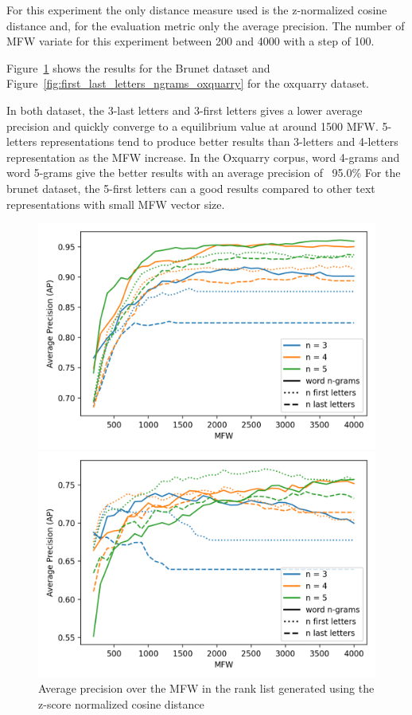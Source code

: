 For this experiment the only distance measure used is the z-normalized cosine distance and, for the evaluation metric only the average precision.
The number of MFW variate for this experiment between 200 and 4000 with a step of 100.

Figure~\ref{fig:first_last_letters_ngrams_brunet} shows the results for the Brunet dataset and Figure~\ref{fig:first_last_letters_ngrams_oxquarry} for the oxquarry dataset.

In both dataset, the 3-last letters and 3-first letters gives a lower average precision and quickly converge to a equilibrium value at around 1500 MFW.
5-letters representations tend to produce better results than 3-letters and 4-letters representation as the MFW increase.
In the Oxquarry corpus, word 4-grams and word 5-grams give the better results with an average precision of ~95.0\%
For the brunet dataset, the 5-first letters can a good results compared to other text representations with small MFW vector size.

\begin{figure}
  \centering
  \caption{Average precision over the MFW in the rank list generated using the z-score normalized cosine distance}

  \label{fig:first_last_letters_ngrams_oxquarry}
  \includegraphics[width=\linewidth]{img/first_last_letters_ngrams_oxquarry.png}

  \label{fig:first_last_letters_ngrams_brunet}
  \includegraphics[width=\linewidth]{img/first_last_letters_ngrams_brunet.png}
\end{figure}

